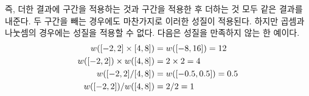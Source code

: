 즉, 더한 결과에 구간을 적용하는 것과 구간을 적용한 후 더하는 것 모두 같은
결과를 내준다. 두 구간을 빼는 경우에도 마찬가지로 이러한 성질이
적용된다. 하지만 곱셈과 나눗셈의 경우에는 성질을 적용할 수 없다. 다음은 성질을
만족하지 않는 한 예이다.
\begin{align}
  w([-2,2]\times[4,8]) & = w([-8,16]) = 12 \notag \\
  w([-2,2]) \times w([4,8]) & = 2 \times 2 = 4 \notag \\
  w([-2,2]/[4,8]) & = w([-0.5,0.5]) = 0.5 \notag \\
  w([-2,2]) / w([4,8]) & = 2 / 2 = 1 \notag
\end{align}

